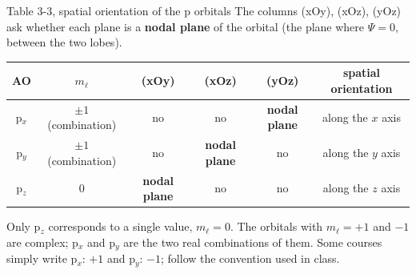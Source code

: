 \begin{handout}{Table 3-3, spatial orientation of the p orbitals}
The columns (xOy), (xOz), (yOz) ask whether each plane is a \textbf{nodal plane} of the orbital
(the plane where $\Psi = 0$, between the two lobes).
\begin{center}\small
\begin{tabular}{|c|c|c|c|c|c|}
\hline
AO & $m_\ell$ & (xOy) & (xOz) & (yOz) & spatial orientation\\ \hline
p$_x$ & $\pm1$ (combination) & no & no & \textbf{nodal plane} & along the $x$ axis\\ \hline
p$_y$ & $\pm1$ (combination) & no & \textbf{nodal plane} & no & along the $y$ axis\\ \hline
p$_z$ & 0 & \textbf{nodal plane} & no & no & along the $z$ axis\\ \hline
\end{tabular}
\end{center}
Only p$_z$ corresponds to a single value, $m_\ell = 0$. The orbitals with $m_\ell = +1$ and $-1$ are
complex; p$_x$ and p$_y$ are the two real combinations of them. Some courses simply write
p$_x$: $+1$ and p$_y$: $-1$; follow the convention used in class.
\end{handout}

